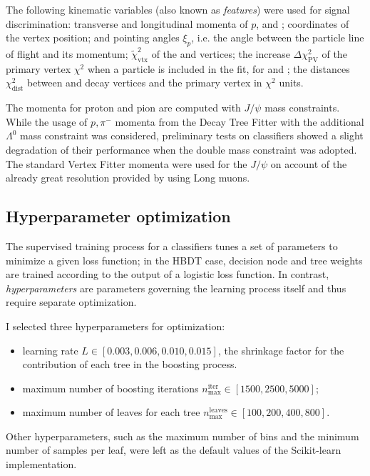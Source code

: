 The following kinematic variables (also known as \textit{features}) were used for signal discrimination:
transverse and longitudinal momenta of $p$, \pim and \jpsi;
coordinates of the \lambdadecay vertex position;
\lbz and \lz pointing angles $\xi_p$, i.e. the angle between the particle line of flight and its momentum;
$\tilde{\chi}^2_\text{vtx}$ of the \demonstratorshort and \lambdadecay vertices;
the increase $\Delta \chi^2_\text{PV}$ of the primary vertex $\chi^2$ when a particle is included in the fit, for \lbz and \lz;
the distances $\chi^2_\text{dist}$ between \lbz and \lz decay vertices and the primary vertex in $\chi^2$ units.

The momenta for proton and pion are computed with $J/\psi$ mass constraints.
While the usage of $p,\pi^-$ momenta from the Decay Tree Fitter with the additional $\Lambda^0$ mass constraint was considered, preliminary tests on classifiers showed a slight degradation of their performance when the double mass constraint was adopted.
The standard Vertex Fitter momenta were used for the $J/\psi$ on account of the already great resolution provided by using Long muons.

\subsection{Hyperparameter optimization}
\label{sec:4:hyperoptimization}

The supervised training process for a classifiers tunes a set of parameters to minimize a given loss function; in the HBDT case, decision node and tree weights are trained according to the output of a logistic loss function.
In contrast, \textit{hyperparameters} are parameters governing the learning process itself and thus require separate optimization.

I selected three hyperparameters for optimization:
\begin{itemize}
	\item learning rate $L \in [0.003, 0.006, 0.010, 0.015]$, the shrinkage factor for the contribution of each tree in the boosting process.
	\item maximum number of boosting iterations $n_\text{max}^\text{iter} \in [1500, 2500, 5000]$;
	\item maximum number of leaves for each tree $n_\text{max}^\text{leaves} \in [100, 200, 400, 800]$.
\end{itemize}
Other hyperparameters, such as the maximum number of bins and the minimum number of samples per leaf, were left as the default values of the Scikit-learn implementation.

